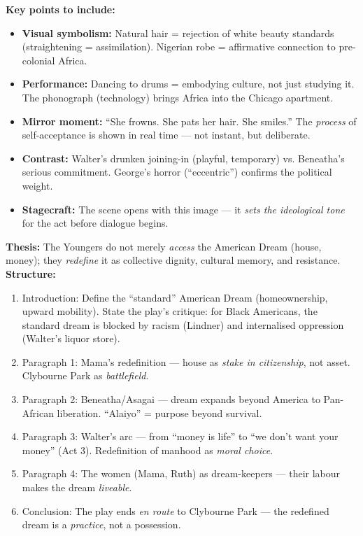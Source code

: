 \documentclass[11pt]{article}
\begin{document}
\begin{corrige}
\textbf{Key points to include:}
\begin{itemize}
\item \textbf{Visual symbolism:} Natural hair = rejection of white beauty standards (straightening = assimilation). Nigerian robe = affirmative connection to pre-colonial Africa.
\item \textbf{Performance:} Dancing to drums = embodying culture, not just studying it. The phonograph (technology) brings Africa into the Chicago apartment.
\item \textbf{Mirror moment:} ``She frowns. She pats her hair. She smiles.'' The \emph{process} of self-acceptance is shown in real time — not instant, but deliberate.
\item \textbf{Contrast:} Walter's drunken joining-in (playful, temporary) vs. Beneatha's serious commitment. George's horror (``eccentric'') confirms the political weight.
\item \textbf{Stagecraft:} The scene opens with this image — it \emph{sets the ideological tone} for the act before dialogue begins.
\end{itemize}
\end{corrige}

\begin{corrige}
\textbf{Thesis:} The Youngers do not merely \emph{access} the American Dream (house, money); they \emph{redefine} it as collective dignity, cultural memory, and resistance.
\textbf{Structure:}
\begin{enumerate}
\item Introduction: Define the ``standard'' American Dream (homeownership, upward mobility). State the play's critique: for Black Americans, the standard dream is blocked by racism (Lindner) and internalised oppression (Walter's liquor store).
\item Paragraph 1: Mama's redefinition — house as \emph{stake in citizenship}, not asset. Clybourne Park as \emph{battlefield}.
\item Paragraph 2: Beneatha/Asagai — dream expands beyond America to Pan-African liberation. ``Alaiyo'' = purpose beyond survival.
\item Paragraph 3: Walter's arc — from ``money is life'' to ``we don't want your money'' (Act 3). Redefinition of manhood as \emph{moral choice}.
\item Paragraph 4: The women (Mama, Ruth) as dream-keepers — their labour makes the dream \emph{liveable}.
\item Conclusion: The play ends \emph{en route} to Clybourne Park — the redefined dream is a \emph{practice}, not a possession.
\end{enumerate}
\end{corrige}
\end{document}
